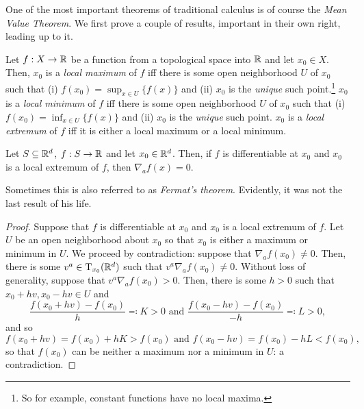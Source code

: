 One of the most important theorems of traditional calculus is of course the \emph{Mean Value Theorem}.  We first prove a couple of results, important in their own right, leading up to it.
\begin{dfn}\label{LocalExtrema}
Let $f:X\rightarrow \R$ be a function from a topological space into $\R$ and let $x_0\in X$.  Then, $x_0$ is a \emph{local maximum} of $f$ iff there is some open neighborhood $U$ of $x_0$ such that (i) $f(x_0)=\sup _{x\in U}\{ f(x)\}$ and (ii) $x_0$ is the \emph{unique} such point.\footnote{So for example, constant functions have no local maxima.}  $x_0$ is a \emph{local minimum} of $f$ iff there is some open neighborhood $U$ of $x_0$ such that (i) $f(x_0)=\inf _{x\in U}\{ f(x)\}$ and (ii) $x_0$ is the \emph{unique} such point.  $x_0$ is a \emph{local extremum} of $f$ iff it is either a local maximum or a local minimum.
\end{dfn}
\begin{prp}\label{FirstDerivativeTest}
Let $S\subseteq \R ^d$, $f:S\rightarrow \R$ and let $x_0\in \R ^d$.  Then, if $f$ is differentiable at $x_0$ and $x_0$ is a local extremum of $f$, then $\nabla _af(x)=0$.
\begin{rmk}
Sometimes this is also referred to as \emph{Fermat's theorem}.  Evidently, it was not the last result of his life.
\end{rmk}
\begin{proof}
Suppose that $f$ is differentiable at $x_0$ and $x_0$ is a local extremum of $f$.  Let $U$ be an open neighborhood about $x_0$ so that $x_0$ is either a maximum or minimum in $U$.  We proceed by contradiction:  suppose that $\nabla _af(x_0)\neq 0$.  Then, there is some $v^a\in \tangent{\R ^d}{x_0}$ such that $v^a\nabla _af(x_0)\neq 0$.  Without loss of generality, suppose that $v^a\nabla _af(x_0)>0$.  Then, there is some $h>0$ such that $x_0+hv,x_0-hv\in U$ and
\begin{equation}
\frac{f(x_0+hv)-f(x_0)}{h}\eqqcolon K>0\text{ and }\frac{f(x_0-hv)-f(x_0)}{-h}\eqqcolon L>0,
\end{equation}
and so
\begin{equation}
f(x_0+hv)=f(x_0)+hK>f(x_0)\text{ and }f(x_0-hv)=f(x_0)-hL<f(x_0),
\end{equation}
so that $f(x_0)$ can be neither a maximum nor a minimum in $U$:  a contradiction.
\end{proof}
\end{prp}

